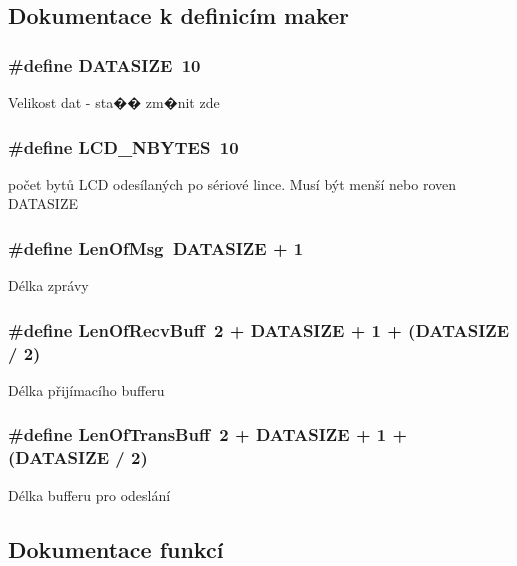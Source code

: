 \subsection{Dokumentace k definicím maker}
\subsubsection[{DATASIZE}]{\setlength{\rightskip}{0pt plus 5cm}\#define DATASIZE~10}\label{usart_8h_acb383144a04ad304680b840cd65af5a5}
Velikost dat -\/ sta�� zm�nit zde 
\subsubsection[{LCD\_\-NBYTES}]{\setlength{\rightskip}{0pt plus 5cm}\#define LCD\_\-NBYTES~10}\label{usart_8h_ae86b88ffc9a31c1fea5b564c0aadbadb}
počet bytů LCD odesílaných po sériové lince. Musí být menší nebo roven DATASIZE 
\subsubsection[{LenOfMsg}]{\setlength{\rightskip}{0pt plus 5cm}\#define LenOfMsg~DATASIZE + 1}\label{usart_8h_a3225b26e3c8329d83e786c441799c2d2}
Délka zprávy 
\subsubsection[{LenOfRecvBuff}]{\setlength{\rightskip}{0pt plus 5cm}\#define LenOfRecvBuff~2 + DATASIZE + 1 + (DATASIZE / 2)}\label{usart_8h_a917d375e0dd558c0164221a1a0a75a97}
Délka přijímacího bufferu 
\subsubsection[{LenOfTransBuff}]{\setlength{\rightskip}{0pt plus 5cm}\#define LenOfTransBuff~2 + DATASIZE + 1 + (DATASIZE / 2)}\label{usart_8h_ad24ac1262ed4066d12091ee2d4b640ca}
Délka bufferu pro odeslání 

\subsection{Dokumentace funkcí}

